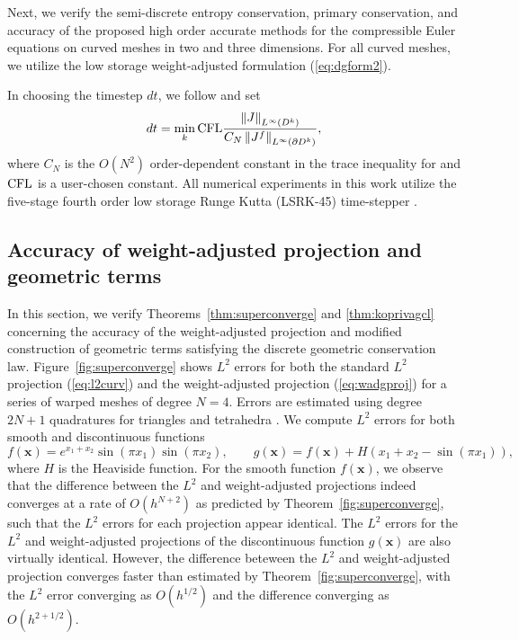 \documentclass[preprint,10pt]{article}
\theoremstyle{definition}
\theoremstyle{lemma}
\theoremstyle{theorem}
\theoremstyle{assumption}
\newcommand{\nor}[1]{\left\| #1 \right\|}
\newcommand{\LRp}[1]{\left( #1 \right)}
\begin{document}
{Next, we verify the semi-discrete entropy conservation, primary conservation, and accuracy of the proposed high order accurate methods for the compressible Euler equations on curved meshes in two and three dimensions.  For all curved meshes, we utilize the low storage weight-adjusted formulation (\ref{eq:dgform2}).  

In choosing the timestep $dt$, we follow \cite{chan2015gpu} and set 
\begin{equation}
dt = \min_{k} {\rm CFL} \frac{\nor{J}_{L^{\infty}\LRp{D^k}}}{C_N\nor{J^f}_{L^{\infty}\LRp{\partial D^k}}},
\end{equation}
where $C_N$ is the $O(N^2)$ order-dependent constant in the trace inequality for \cite{warburton2003constants} and ${\rm CFL}$ is a user-chosen constant.  All numerical experiments in this work utilize the five-stage fourth order low storage Runge Kutta (LSRK-45) time-stepper \cite{carpenter1994fourth}.  


\subsection{Accuracy of weight-adjusted projection and geometric terms}

In this section, we verify Theorems~\ref{thm:superconverge} and \ref{thm:koprivagcl} concerning the accuracy of the weight-adjusted projection and modified construction of geometric terms satisfying the discrete geometric conservation law.  Figure~\ref{fig:superconverge} shows $L^2$ errors for both the standard $L^2$ projection (\ref{eq:l2curv}) and the weight-adjusted projection (\ref{eq:wadgproj}) for a series of warped meshes of degree $N = 4$.  Errors are estimated using degree $2N+1$ quadratures for triangles and tetrahedra \cite{xiao2010quadrature}.  We compute $L^2$ errors for both smooth and discontinuous functions
\[
f(\bm{x}) = e^{x_1+x_2}\sin\LRp{{\pi x_1}}\sin\LRp{{\pi x_2}}, \qquad g(\bm{x}) = f(\bm{x}) + H(x_1+x_2-\sin(\pi x_1)),
\]
where $H$ is the Heaviside function.  For the smooth function $f(\bm{x})$, we observe that the difference between the $L^2$ and weight-adjusted projections indeed converges at a rate of $O\LRp{h^{N+2}}$ as predicted by Theorem~\ref{fig:superconverge}, such that the $L^2$ errors for each projection appear identical.  The $L^2$ errors for the $L^2$ and weight-adjusted projections of the discontinuous function $g(\bm{x})$ are also virtually identical.  However, the difference beteween the $L^2$ and weight-adjusted projection converges faster than estimated by Theorem~\ref{fig:superconverge}, with the $L^2$ error converging as $O(h^{1/2})$ and the difference converging as $O(h^{2+1/2})$. 

}
\end{document}
